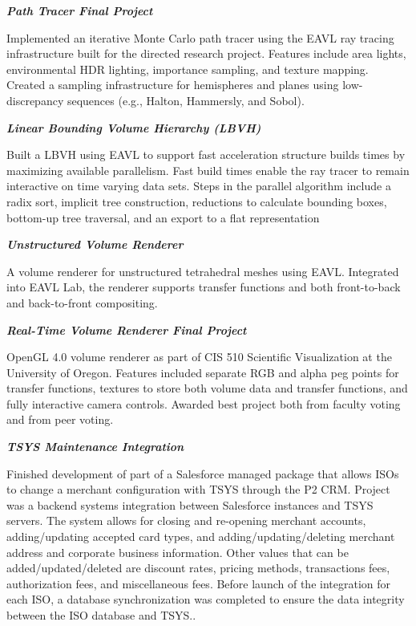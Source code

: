 \documentclass[margin,line]{res}
\begin{document}
\begin{resume}
{\em \textbf{Path Tracer Final Project} }

\vspace{-.4cm}
Implemented an iterative Monte Carlo path tracer using the EAVL ray tracing infrastructure built for the directed research project. Features include area lights, environmental HDR lighting, importance sampling, and texture mapping. Created a sampling infrastructure for hemispheres and planes using low-discrepancy sequences (e.g., Halton, Hammersly, and Sobol). 

{\em \textbf{Linear Bounding Volume Hierarchy (LBVH)} }

\vspace{-.4cm}
Built a LBVH using EAVL to support fast acceleration structure builds times by maximizing available parallelism. Fast build times enable the ray tracer to remain interactive on time varying data sets. Steps in the parallel algorithm include a radix sort, implicit tree construction, reductions to calculate bounding boxes, bottom-up tree traversal, and an export to a flat representation

{\em \textbf{Unstructured Volume Renderer} }

\vspace{-.4cm}
A volume renderer for unstructured tetrahedral meshes using EAVL. Integrated into EAVL Lab, the renderer supports transfer functions and both front-to-back and back-to-front compositing.

{\em \textbf{Real-Time Volume Renderer Final Project} }

\vspace{-.4cm}
OpenGL 4.0 volume renderer as part of CIS 510 Scientific Visualization at the University of Oregon. Features included separate RGB and alpha peg points for transfer functions, textures to store both volume data and transfer functions, and fully interactive camera controls. Awarded best project both from faculty voting and from peer voting. 

{\em \textbf{TSYS Maintenance Integration} }

\vspace{-.4cm}
Finished development of part of a Salesforce managed package that allows ISOs to change a merchant configuration with TSYS through the P2 CRM. Project was a backend systems integration between Salesforce instances and TSYS servers. The system allows for closing and re-opening merchant accounts, adding/updating accepted card types, and adding/updating/deleting merchant address and corporate business information. Other values that can be added/updated/deleted are discount rates, pricing methods, transactions fees, authorization fees, and miscellaneous fees. Before launch of the integration for each ISO, a database synchronization was completed to ensure the data integrity between the ISO database and TSYS..


\end{resume}
\end{document}
